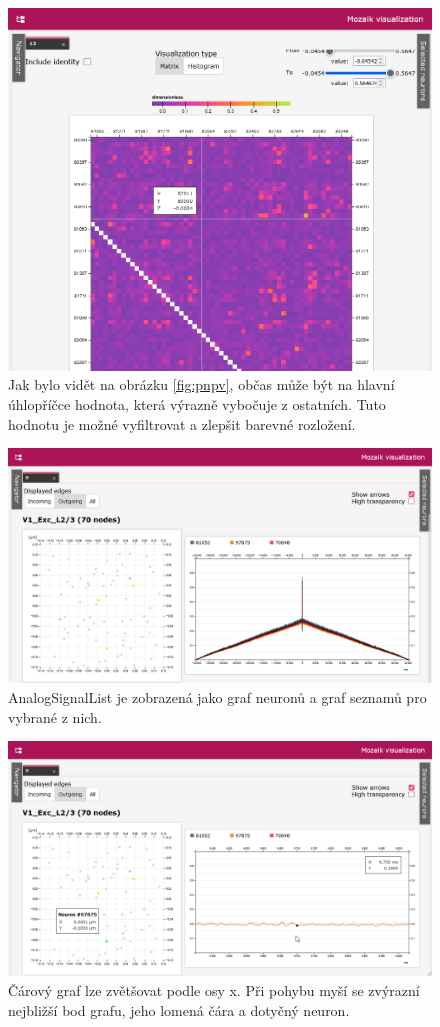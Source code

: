 \begin{figure}
	\centering
	\includegraphics[width=1\linewidth]{img/screenshot_pnpv_noident.png}
	\caption{Jak bylo vidět na obrázku \ref{fig:pnpv}, občas může být na hlavní úhlopříčce hodnota, která výrazně vybočuje z ostatních. Tuto hodnotu je možné vyfiltrovat a zlepšit barevné rozložení.}
	\label{fig:pnpv_noident}
\end{figure}

\begin{figure}
	\centering
	\includegraphics[width=1\linewidth]{img/screenshot_asl.png}
	\caption{AnalogSignalList je zobrazená jako graf neuronů a graf seznamů pro vybrané z nich.}
	\label{fig:asl}
\end{figure}

\begin{figure}
	\centering
	\includegraphics[width=1\linewidth]{img/screenshot_asl_zoom.png}
	\caption{Čárový graf lze zvětšovat podle osy x. Při pohybu myší se zvýrazní nejbližší bod grafu, jeho lomená čára a dotyčný neuron.}
	\label{fig:asl_zoom}
\end{figure}